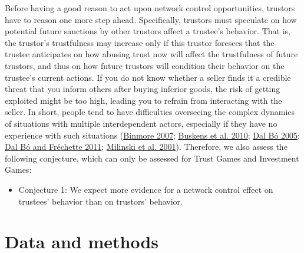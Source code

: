 \documentclass[
  11pt,
]{article}
\providecommand{\tightlist}{%
  \setlength{\itemsep}{0pt}\setlength{\parskip}{0pt}}
\begin{document}
Before having a good reason to act upon network control opportunities, trustors have to reason one more step ahead.
Specifically, trustors must speculate on how potential future sanctions by other trustors affect a trustee's behavior.
That is, the trustor's trustfulness may increase only if this trustor foresees that the trustee anticipates on how abusing trust now will affect the trustfulness of future trustors, and thus on how future trustors will condition their behavior on the trustee's current actions.
If you do not know whether a seller finds it a credible threat that you inform others after buying inferior goods, the risk of getting exploited might be too high, leading you to refrain from interacting with the seller.
In short, people tend to have difficulties overseeing the complex dynamics of situations with multiple interdependent actors, especially if they have no experience with such situations (\protect\hyperlink{ref-binmore_playing_2007}{Binmore 2007}; \protect\hyperlink{ref-buskens_raub_veer_triads_2010}{Buskens et al. 2010}; \protect\hyperlink{ref-dal_buxf3_cooperation_2005}{Dal Bó 2005}; \protect\hyperlink{ref-dal_buxf3_fruxe9chette_evolution_2011}{Dal Bó and Fréchette 2011}; \protect\hyperlink{ref-milinski_cooperation_2001}{Milinski et al. 2001}). Therefore, we also assess the following conjecture, which can only be assessed for Trust Games and Investment Games:

\begin{itemize}
\tightlist
\item
  Conjecture 1: We expect more evidence for a network control effect on trustees' behavior than on trustors' behavior.
\end{itemize}

\hypertarget{data-and-methods}{%
\section{Data and methods}\label{data-and-methods}}
\end{document}
